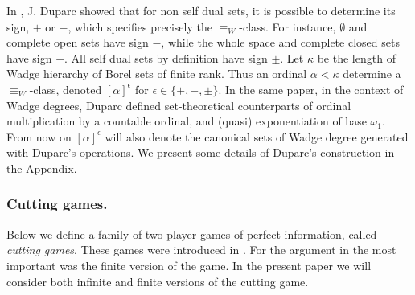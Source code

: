 In \cite{dup1}, J. Duparc showed that for non self dual sets, it is possible to determine its sign, $+$
or $-$, which specifies precisely the $\equiv_W$-class. 
For instance, $\emptyset$ and complete open sets have sign $-$, while the whole space and complete closed  sets have sign $+$.
  All self dual sets by
definition have sign $\pm$. Let $\kappa$ be the length of Wadge hierarchy of Borel sets of finite rank. 
Thus an ordinal $\alpha <\kappa$
determine a $\equiv_W$-class, denoted  $[\alpha]^\epsilon$ for $\epsilon\in \{+,-,\pm\}$. %
In the same paper,  in the context of Wadge degrees, Duparc defined  set-theoretical counterparts of ordinal multiplication by a countable ordinal, and (quasi) exponentiation of base $\omega_1$. %
From now on $[\alpha]^\epsilon$ will also denote the canonical sets of Wadge degree generated with Duparc's operations. We present some details of Duparc's construction in the Appendix. 
\subsubsection*{Cutting games.}
Below we define a family of two-player games of perfect information, called \emph{cutting games}. These games were
introduced in \cite{bp}. For the argument in \cite{bp} the most important was the finite version of the game. In the present paper 
we will consider both infinite and finite versions of the cutting game. %

